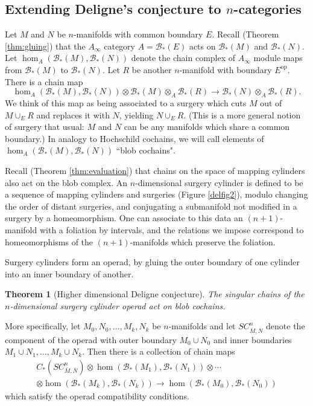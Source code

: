 \documentclass{pnastwo}
\def\bc{{\mathcal B}}
\def\ot{\otimes}
\newtheorem{thm}[prop]{Theorem}
\begin{document}
\begin{article}
\section{Extending Deligne's conjecture to $n$-categories}
\label{sec:applications}

Let $M$ and $N$ be $n$-manifolds with common boundary $E$.
Recall (Theorem \ref{thm:gluing}) that the $A_\infty$ category $A = \bc_*(E)$
acts on $\bc_*(M)$ and $\bc_*(N)$.
Let $\hom_A(\bc_*(M), \bc_*(N))$ denote the chain complex of $A_\infty$ module maps
from $\bc_*(M)$ to $\bc_*(N)$.
Let $R$ be another $n$-manifold with boundary $E^\text{op}$.
There is a chain map
\begin{equation*}
	\hom_A(\bc_*(M), \bc_*(N)) \ot \bc_*(M) \ot_A \bc_*(R) \to \bc_*(N) \ot_A \bc_*(R) .
\end{equation*}
We think of this map as being associated to a surgery which cuts $M$ out of $M\cup_E R$ and
replaces it with $N$, yielding $N\cup_E R$.
(This is a more general notion of surgery that usual: $M$ and $N$ can be any manifolds
which share a common boundary.)
In analogy to Hochschild cochains, we will call elements of $\hom_A(\bc_*(M), \bc_*(N))$ ``blob cochains".

Recall (Theorem \ref{thm:evaluation}) that chains on the space of mapping cylinders also act on the 
blob complex.
An $n$-dimensional surgery cylinder is 
defined to be a sequence of mapping cylinders and surgeries (Figure \ref{delfig2}), 
modulo changing the order of distant surgeries, and conjugating a submanifold not modified in a surgery by a homeomorphism. 
One can associate to this data an $(n{+}1)$-manifold with a foliation by intervals,
and the relations we impose correspond to homeomorphisms of the $(n{+}1)$-manifolds
which preserve the foliation.

Surgery cylinders form an operad, by gluing the outer boundary of one cylinder into an inner boundary of another.

\begin{thm}[Higher dimensional Deligne conjecture]
\label{thm:deligne}
The singular chains of the $n$-dimensional surgery cylinder operad act on blob cochains.
\end{thm}

More specifically, let $M_0, N_0, \ldots, M_k, N_k$ be $n$-manifolds and let $SC^n_{\overline{M}, \overline{N}}$
denote the component of the operad with outer boundary $M_0\cup N_0$ and inner boundaries
$M_1\cup N_1,\ldots, M_k\cup N_k$.
Then there is a collection of chain maps
\begin{multline*}
	C_*(SC^n_{\overline{M}, \overline{N}})\otimes \hom(\bc_*(M_1), \bc_*(N_1))\otimes\cdots \\
		\otimes \hom(\bc_*(M_{k}), \bc_*(N_{k})) \to  \hom(\bc_*(M_0), \bc_*(N_0))
\end{multline*}
which satisfy the operad compatibility conditions.


\end{article}
\end{document}
